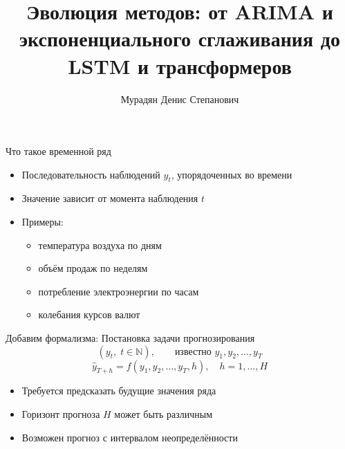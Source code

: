 \documentclass[aspectratio=1610,12pt]{beamer}
\begin{document}
\title[Эволюция методов]{Эволюция методов: от ARIMA и экспоненциального сглаживания до LSTM и трансформеров}
\author[Мурадян Д. С.]{Мурадян Денис Степанович}
\date{\number\year}




\begin{frame}
  \titlepage
\end{frame}




\begin{frame}{Что такое временной ряд}
\begin{itemize}
    \item Последовательность наблюдений $y_t$, упорядоченных во времени
    \item Значение зависит от момента наблюдения $t$
    \item Примеры:
    \begin{itemize}
        \item температура воздуха по дням
        \item объём продаж по неделям
        \item потребление электроэнергии по часам
        \item колебания курсов валют
    \end{itemize}
\end{itemize}
\end{frame}

\begin{frame}{Добавим формализма: Постановка задачи прогнозирования}
\[
(y_t,\; t\in\mathbb{N}), \qquad \text{известно } y_1, y_2, \ldots, y_T
\]
\[
\hat{y}_{T+h} = f(y_1, y_2, \ldots, y_T, h),
\quad h = 1,\ldots,H
\]
\begin{itemize}
    \item Требуется предсказать будущие значения ряда
    \item Горизонт прогноза $H$ может быть различным
    \item Возможен прогноз с интервалом неопределённости
\end{itemize}
\end{frame}
\end{document}
